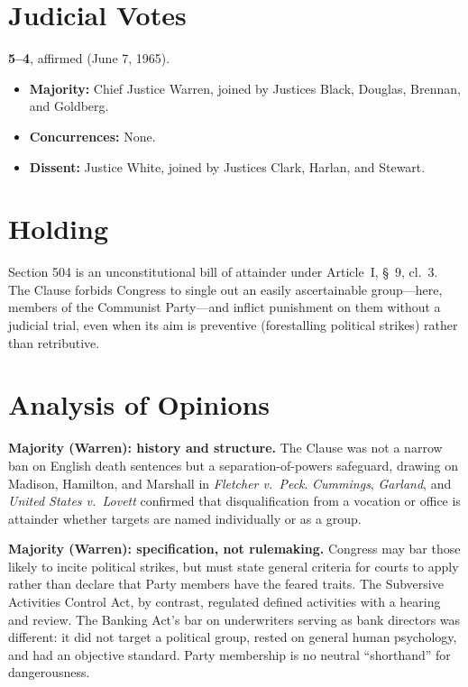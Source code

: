 \documentclass[12pt]{article}
\begin{document}
\section{Judicial Votes}

\textbf{5--4}, affirmed (June 7, 1965).
\begin{itemize}
\item \textbf{Majority:} Chief Justice Warren, joined by Justices Black, Douglas, Brennan, and Goldberg.
\item \textbf{Concurrences:} None.
\item \textbf{Dissent:} Justice White, joined by Justices Clark, Harlan, and Stewart.
\end{itemize}

\section{Holding}

Section 504 is an unconstitutional bill of attainder under Article~I, \S~9, cl.~3. The Clause forbids Congress to single out an easily ascertainable group---here, members of the Communist Party---and inflict punishment on them without a judicial trial, even when its aim is preventive (forestalling political strikes) rather than retributive.

\section{Analysis of Opinions}

\textbf{Majority (Warren): history and structure.} The Clause was not a narrow ban on English death sentences but a separation-of-powers safeguard, drawing on Madison, Hamilton, and Marshall in \textit{Fletcher v.\ Peck}. \textit{Cummings}, \textit{Garland}, and \textit{United States v.\ Lovett} confirmed that disqualification from a vocation or office is attainder whether targets are named individually or as a group.

\textbf{Majority (Warren): specification, not rulemaking.} Congress may bar those likely to incite political strikes, but must state general criteria for courts to apply rather than declare that Party members have the feared traits. The Subversive Activities Control Act, by contrast, regulated defined activities with a hearing and review. The Banking Act's bar on underwriters serving as bank directors was different: it did not target a political group, rested on general human psychology, and had an objective standard. Party membership is no neutral ``shorthand'' for dangerousness.
\end{document}
